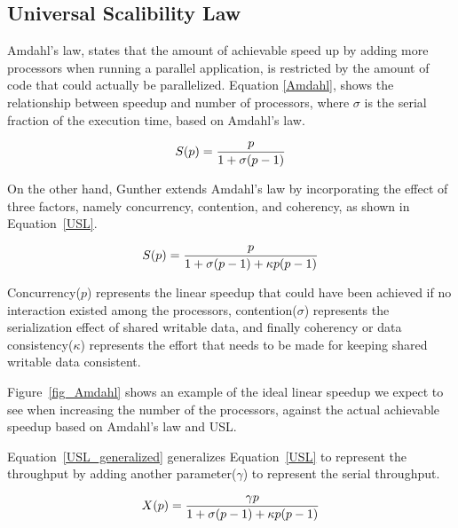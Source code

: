 \subsection{Universal Scalibility Law}
Amdahl's law\cite{amdahl1967validity}, states that the amount of achievable speed up by adding more processors when running a parallel application, is restricted by the amount of code that could actually be parallelized. 
Equation \ref{Amdahl}, shows the relationship between speedup and number of processors, where $\sigma$ is the serial fraction of the execution time, based on Amdahl's law\cite{gunther2007guerrilla}. 

\begin{equation}\label{Amdahl}
S(p) = \frac{p}{1+\sigma(p-1)}\\
\end{equation}

On the other hand, Gunther\cite{gunther2007guerrilla} extends Amdahl's law by incorporating the effect of three factors, namely concurrency, contention, and coherency, as shown in Equation~\ref{USL}.

\begin{equation}\label{USL}
S(p) = \frac{p}{1+\sigma(p-1)+\kappa{p}(p-1)}\\
\end{equation}

Concurrency($p$) represents the linear speedup that could have been achieved if no interaction existed among the processors, contention($\sigma$) represents the serialization effect of shared writable data, and finally coherency or data consistency($\kappa$) represents the effort that needs to be made for keeping shared writable data consistent\cite{gunther2007guerrilla}.    

Figure~\ref{fig_Amdahl} shows an example of the ideal linear speedup we expect to see when increasing the number of the processors, against the actual achievable speedup based on Amdahl's law and USL.

Equation~\ref{USL_generalized} generalizes Equation~\ref{USL} to represent the throughput by adding another parameter($\gamma$) to represent the serial throughput.

\begin{equation}\label{USL_generalized}
X(p) = \frac{\gamma{p}}{1+\sigma(p-1)+\kappa{p}(p-1)}\\
\end{equation}

